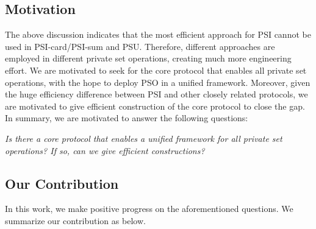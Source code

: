 \documentclass[a4paper,10pt]{article}
\begin{document}
\subsection{Motivation}
The above discussion indicates that the most efficient approach for PSI cannot be used in PSI-card/PSI-sum and PSU. 
Therefore, different approaches are employed in different private set operations, 
creating much more engineering effort. 
We are motivated to seek for the core protocol that enables all private set operations, 
with the hope to deploy PSO in a unified framework.     
Moreover, given the huge efficiency difference between PSI and other closely related protocols, 
we are motivated to give efficient construction of the core protocol to close the gap. 
In summary, we are motivated to answer the following questions:
\begin{center}
\emph{Is there a core protocol that enables a unified framework for all private set operations? 
If so, can we give efficient constructions?} 
\end{center}  

\subsection{Our Contribution}
In this work, we make positive progress on the aforementioned questions. 
We summarize our contribution as below. 
\end{document}
